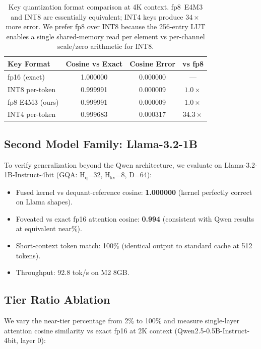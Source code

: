 \documentclass{article}
\begin{document}
\begin{table}[h]
\centering
\begin{tabular}{lccc}
\toprule
Key Format & Cosine vs Exact & Cosine Error & vs fp8 \\
\midrule
fp16 (exact) & 1.000000 & 0.000000 & --- \\
INT8 per-token & 0.999991 & 0.000009 & $1.0\times$ \\
fp8 E4M3 (ours) & 0.999991 & 0.000009 & $1.0\times$ \\
INT4 per-token & 0.999683 & 0.000317 & $34.3\times$ \\
\bottomrule
\end{tabular}
\caption{Key quantization format comparison at 4K context. fp8~E4M3 and
INT8 are essentially equivalent; INT4 keys produce $34\times$ more
error. We prefer fp8 over INT8 because the 256-entry LUT enables a
single shared-memory read per element vs per-channel scale/zero
arithmetic for INT8.}
\label{tab:key_ablation}
\end{table}

\subsection{Second Model Family: Llama-3.2-1B}

To verify generalization beyond the Qwen architecture, we evaluate on
Llama-3.2-1B-Instruct-4bit (GQA: H$_\text{q}$=32, H$_\text{kv}$=8,
D=64):

\begin{itemize}
\item Fused kernel vs dequant-reference cosine: \textbf{1.000000}
  (kernel perfectly correct on Llama shapes).
\item Foveated vs exact fp16 attention cosine: \textbf{0.994}
  (consistent with Qwen results at equivalent near\%).
\item Short-context token match: 100\% (identical output to standard
  cache at 512 tokens).
\item Throughput: 92.8 tok/s on M2 8GB.
\end{itemize}

\subsection{Tier Ratio Ablation}

We vary the near-tier percentage from 2\% to 100\% and measure
single-layer attention cosine similarity vs exact fp16 at 2K context
(Qwen2.5-0.5B-Instruct-4bit, layer 0):
\end{document}
